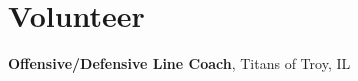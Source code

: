 \documentclass[]{TTurner}
\begin{document}
\begin{minipage}[t]{0.25\textwidth}
\section{Volunteer} 
{\textbf{Offensive/Defensive Line Coach}, Titans of Troy, IL}






\end{minipage} 
\end{document}
